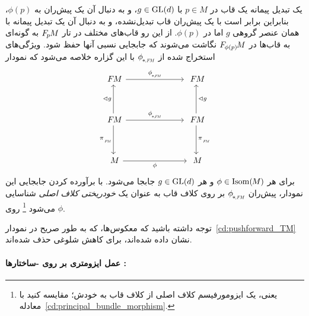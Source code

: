 یک تبدیل پیمانه یک قاب در $p\in M$ با $g\in \operatorname{GL}(d)$، و به دنبال آن یک پیش‌ران به $\phi(p)$، بنابراین برابر است با یک پیش‌ران قاب تبدیل‌نشده، و به دنبال آن یک تبدیل پیمانه با همان عنصر گروهی $g$ اما در $\phi(p)$.
از این رو قاب‌های مختلف در تار $F_{\mkern-1.5mu p}\mkern-1.0muM$ به گونه‌ای به قاب‌ها در $F_{\mkern-1mu\phi(p)}\mkern-2mu M$ نگاشت می‌شوند که جابجایی نسبی آنها حفظ شود.
ویژگی‌های استخراج شده از $\dphiFM$ با این گزاره خلاصه می‌شود که نمودار
\begin{equation}\label{eq:FM_isom_induced_automorphism}
\begin{tikzcd}[column sep=70pt, row sep=35, font=\normalsize]
    \FM
        \arrow[r, "\dphiFM"]
    &
    \FM
    \\
    \FM
        \arrow[r, "\dphiFM"]
        \arrow[d, "\piFM"']
        \arrow[u, "\lhd g"]
    &
    \FM
        \arrow[d, "\piFM"]
        \arrow[u, "\lhd g"']
    \\
    M
        \arrow[r, "\phi"']
    &
    M
\end{tikzcd}
\end{equation}
برای هر $\phi\in\operatorname{Isom}(\mkern-1.5mu M \mkern-.5mu)$ و هر $g\in \operatorname{GL}(d)$ جابجا می‌شود.
با برآورده کردن جابجایی این نمودار، پیش‌ران $\dphiFM$ بر روی کلاف قاب به عنوان یک \emph{خودریختی کلاف اصلی} شناسایی می‌شود%
\footnote{
    یعنی، یک ایزومورفیسم کلاف اصلی از کلاف قاب به خودش؛ مقایسه کنید با معادله~\ref{cd:principal_bundle_morphism}.
}
روی $\phi$.

توجه داشته باشید که معکوس‌ها، که به طور صریح در نمودار~\eqref{cd:pushforward_TM} نشان داده شده‌اند، برای کاهش شلوغی حذف شده‌اند.






\paragraph{عمل ایزومتری بر روی -ساختارها :}

